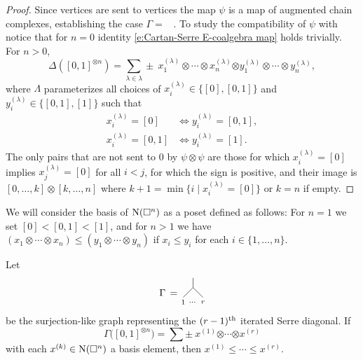 \begin{proof}
	Since vertices are sent to vertices the map $\psi$ is a map of augmented chain complexes, establishing the case $\Gamma =$ \counit \ .
	To study the compatibility of $\psi$ with \coproduct \, notice that for $n=0$ identity \eqref{e:Cartan-Serre E-coalgebra map} holds trivially.
	For $n > 0$,
	\begin{equation*}
	\Delta([0,1]^{\otimes n}) = \sum_{\lambda \in \lambda} \pm \ x_1^{(\lambda)} \otimes \cdots \otimes x_n^{(\lambda)} \bm{\otimes} y_1^{(\lambda)} \otimes \cdots \otimes y_n^{(\lambda)},
	\end{equation*}
	where $\Lambda$ parameterizes all choices of $x_i^{(\lambda)} \in \{[0], [0,1]\}$ and $y_i^{(\lambda)} \in \{[0,1], [1]\}$ such that
	\begin{align*}
	x_i^{(\lambda)} = [0]   & \iff y_i^{(\lambda)} = [0,1], \\
	x_i^{(\lambda)} = [0,1] & \iff y_i^{(\lambda)} = [1].
	\end{align*}
	The only pairs that are not sent to $0$ by $\psi \otimes \psi$ are those for which $x_i^{(\lambda)} = [0]$ implies $x_j^{(\lambda)} = [0]$ for all $i < j$, for which the sign is positive, and their image is $[0,\dots,k] \otimes [k,\dots,n]$ where $k+1 = \min \{i \mid x_i^{(\lambda)} = [0]\}$ or $k = n$ if empty.
\end{proof}

We will consider the basis of $\operatorname{N}(\square^n)$ as a poset defined as follows:
For $n = 1$ we set $[0] < [0,1] < [1]$, and for $n > 1$ we have $(x_1 \otimes \cdots \otimes x_n) \leq (y_1 \otimes \cdots \otimes y_n)$ if $x_i \leq y_i$ for each $i \in \{1, \dots, n\}$. 

\begin{lemma}
	Let
	\begin{equation*}
	\begin{tikzpicture}[scale=.35]
	\node at (9.5, 1){$\Gamma \, = $};
	\draw (11,.5)--(12,1.5)--(12,2.5);
	\draw (13,.5)--(12,1.5);
	\node at (11,0){$\scriptstyle 1$};
	\node at (12,0){$\scriptstyle \dots$};
	\node at (13,0){$\scriptstyle r$};
	\end{tikzpicture}
	\end{equation*}
	be the surjection-like graph representing the $(r-1)^\mathrm{th}$ iterated Serre diagonal.
	If
	\begin{equation*}	
	\Gamma\big([0,1]^{\otimes n}\big) =
	\sum \pm \ x^{(1)} \bm{\otimes} \cdots \bm{\otimes} x^{(r)}
	\end{equation*}
	with each $x^{(k)} \in \operatorname{N}(\square^n)$ a basis element, then $x^{(1)} \leq \cdots \leq x^{(r)}$.
\end{lemma}

